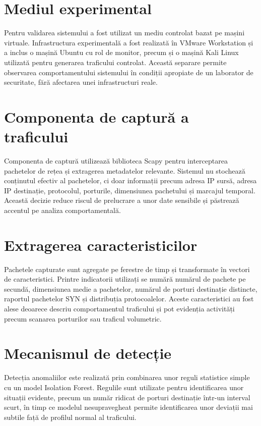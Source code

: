 \section{Mediul experimental}

Pentru validarea sistemului a fost utilizat un mediu controlat bazat pe mașini virtuale. Infrastructura experimentală a fost realizată în VMware Workstation și a inclus o mașină Ubuntu cu rol de monitor, precum și o mașină Kali Linux utilizată pentru generarea traficului controlat. Această separare permite observarea comportamentului sistemului în condiții apropiate de un laborator de securitate, fără afectarea unei infrastructuri reale.

\section{Componenta de captură a traficului}

Componenta de captură utilizează biblioteca Scapy pentru interceptarea pachetelor de rețea și extragerea metadatelor relevante. Sistemul nu stochează conținutul efectiv al pachetelor, ci doar informații precum adresa IP sursă, adresa IP destinație, protocolul, porturile, dimensiunea pachetului și marcajul temporal. Această decizie reduce riscul de prelucrare a unor date sensibile și păstrează accentul pe analiza comportamentală.

\section{Extragerea caracteristicilor}

Pachetele capturate sunt agregate pe ferestre de timp și transformate în vectori de caracteristici. Printre indicatorii utilizați se numără numărul de pachete pe secundă, dimensiunea medie a pachetelor, numărul de porturi destinație distincte, raportul pachetelor SYN și distribuția protocoalelor. Aceste caracteristici au fost alese deoarece descriu comportamentul traficului și pot evidenția activități precum scanarea porturilor sau traficul volumetric.

\section{Mecanismul de detecție}

Detecția anomaliilor este realizată prin combinarea unor reguli statistice simple cu un model Isolation Forest. Regulile sunt utilizate pentru identificarea unor situații evidente, precum un număr ridicat de porturi destinație într-un interval scurt, în timp ce modelul nesupravegheat permite identificarea unor deviații mai subtile față de profilul normal al traficului.
